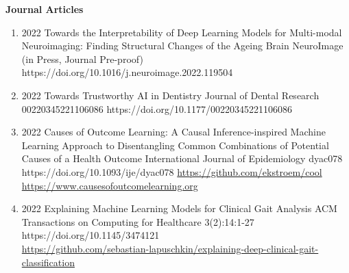 \documentclass[10pt,a4paper]{article} %
\begin{document}
\headedsection %
{\bf Journal Articles}{ }
{
\begin{enumerate}

    \item {}
                            {2022}
                            {Towards the Interpretability of Deep Learning Models for Multi-modal Neuroimaging: Finding Structural Changes of the Ageing Brain}
                            {NeuroImage}
                            {(in Press, Journal Pre-proof)}
                            {https://doi.org/10.1016/j.neuroimage.2022.119504}


    \item {}
                        {2022}
                        {Towards Trustworthy AI in Dentistry}
                        {Journal of Dental Research}
                        {00220345221106086}
                        {https://doi.org/10.1177/00220345221106086}


    \item {}
                        {2022}
                        {Causes of Outcome Learning: A Causal Inference-inspired Machine Learning Approach to Disentangling Common Combinations of Potential Causes of a Health Outcome}
                        {International Journal of Epidemiology}
                        {dyac078}
                        {https://doi.org/10.1093/ije/dyac078}
                        {\href{https://github.com/ekstroem/cool}{https://github.com/ekstroem/cool}\\
                         \href{https://www.causesofoutcomelearning.org}{https://www.causesofoutcomelearning.org}
                        }

    \item {}
                        {2022}
                        {Explaining Machine Learning Models for Clinical Gait Analysis}
                        {ACM Transactions on Computing for Healthcare}
                        {3(2):14:1-27}
                        {https://doi.org/10.1145/3474121}
                        {\\\href{https://github.com/sebastian-lapuschkin/explaining-deep-clinical-gait-classification}{https://github.com/sebastian-lapuschkin/explaining-deep-clinical-gait-classification}}



\end{enumerate}}
\end{document}
